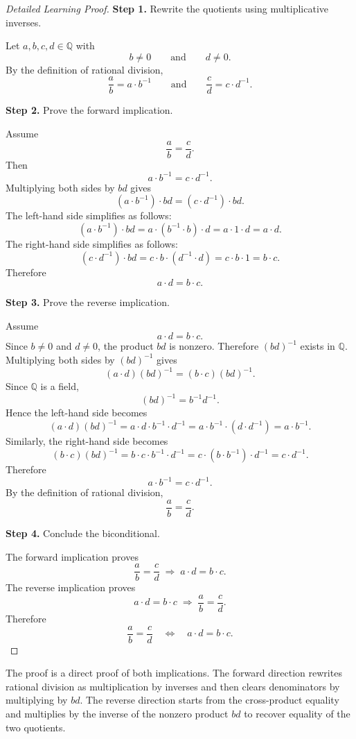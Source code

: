 \begin{proof}[Detailed Learning Proof]
\LRAProofBodyStart

\textbf{Step 1.} Rewrite the quotients using multiplicative inverses.

Let $a,b,c,d\in\mathbb{Q}$ with
\[
b\neq 0
\qquad\text{and}\qquad
d\neq 0.
\]
By the definition of rational division,
\[
\frac{a}{b}=a\cdot b^{-1}
\qquad\text{and}\qquad
\frac{c}{d}=c\cdot d^{-1}.
\]

\textbf{Step 2.} Prove the forward implication.

Assume
\[
\frac{a}{b}=\frac{c}{d}.
\]
Then
\[
a\cdot b^{-1}=c\cdot d^{-1}.
\]
Multiplying both sides by $bd$ gives
\[
(a\cdot b^{-1})\cdot bd=(c\cdot d^{-1})\cdot bd.
\]
The left-hand side simplifies as follows:
\[
(a\cdot b^{-1})\cdot bd
=
a\cdot (b^{-1}\cdot b)\cdot d
=
a\cdot 1\cdot d
=
a\cdot d.
\]
The right-hand side simplifies as follows:
\[
(c\cdot d^{-1})\cdot bd
=
c\cdot b\cdot (d^{-1}\cdot d)
=
c\cdot b\cdot 1
=
b\cdot c.
\]
Therefore
\[
a\cdot d=b\cdot c.
\]

\textbf{Step 3.} Prove the reverse implication.

Assume
\[
a\cdot d=b\cdot c.
\]
Since $b\neq 0$ and $d\neq 0$, the product $bd$ is nonzero. Therefore
$(bd)^{-1}$ exists in $\mathbb{Q}$. Multiplying both sides by $(bd)^{-1}$
gives
\[
(a\cdot d)(bd)^{-1}=(b\cdot c)(bd)^{-1}.
\]
Since $\mathbb{Q}$ is a field,
\[
(bd)^{-1}=b^{-1}d^{-1}.
\]
Hence the left-hand side becomes
\[
(a\cdot d)(bd)^{-1}
=
a\cdot d\cdot b^{-1}\cdot d^{-1}
=
a\cdot b^{-1}\cdot (d\cdot d^{-1})
=
a\cdot b^{-1}.
\]
Similarly, the right-hand side becomes
\[
(b\cdot c)(bd)^{-1}
=
b\cdot c\cdot b^{-1}\cdot d^{-1}
=
c\cdot (b\cdot b^{-1})\cdot d^{-1}
=
c\cdot d^{-1}.
\]
Therefore
\[
a\cdot b^{-1}=c\cdot d^{-1}.
\]
By the definition of rational division,
\[
\frac{a}{b}=\frac{c}{d}.
\]

\textbf{Step 4.} Conclude the biconditional.

The forward implication proves
\[
\frac{a}{b}=\frac{c}{d}
\;\Longrightarrow\;
a\cdot d=b\cdot c.
\]
The reverse implication proves
\[
a\cdot d=b\cdot c
\;\Longrightarrow\;
\frac{a}{b}=\frac{c}{d}.
\]
Therefore
\[
\frac{a}{b}=\frac{c}{d}
\quad\Longleftrightarrow\quad
a\cdot d=b\cdot c.
\]
\end{proof}

\begin{remark*}
The proof is a direct proof of both implications. The forward direction
rewrites rational division as multiplication by inverses and then clears
denominators by multiplying by $bd$. The reverse direction starts from
the cross-product equality and multiplies by the inverse of the nonzero
product $bd$ to recover equality of the two quotients.
\end{remark*}

